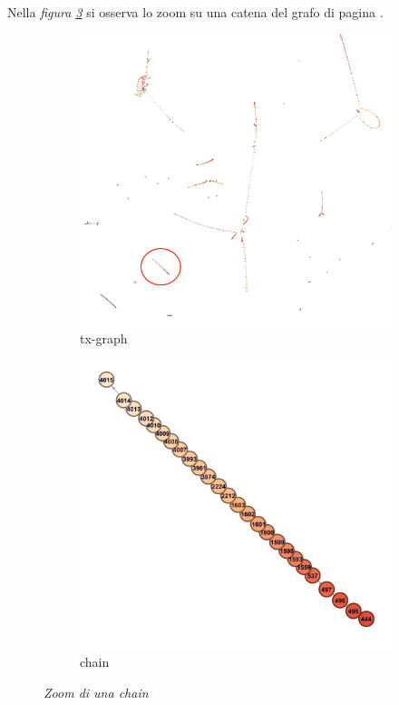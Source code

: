 Nella \textit{figura \ref{fig:zoomchain}} si osserva lo zoom su una catena del grafo di pagina \pageref*{fig:txgraph}.

\begin{figure}[htbp]
	\centering
	\begin{subfigure}[b]{0.4\textwidth}
		\includegraphics[width=\textwidth]{figure/zoomchain1}
		\caption{tx-graph}
		\label{fig:zoomchain1}
	\end{subfigure}\quad \qquad
	\begin{subfigure}[b]{0.4 \textwidth}
		\includegraphics[width=\textwidth]{figure/zoomchain2}
		\caption{chain}
		\label{fig:zoomchain2}
	\end{subfigure}
	\caption{\textit{Zoom di una chain}}\label{fig:zoomchain}
\end{figure}

